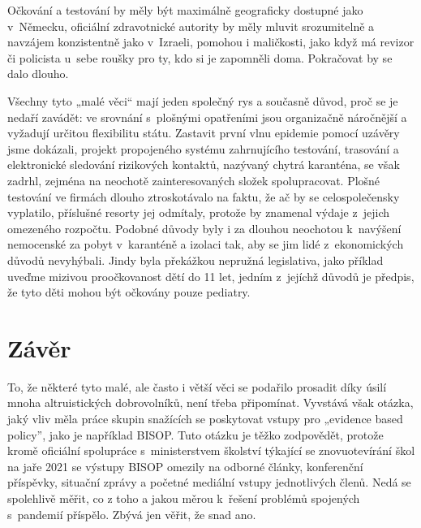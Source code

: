 Očkování a testování by měly být maximálně geograficky dostupné jako v~Ně\-mec\-ku, oficiální zdravotnické autority by měly mluvit srozumitelně a navzájem konzistentně jako v~Izraeli, pomohou i maličkosti, jako když má revizor či policista u~sebe roušky pro ty, kdo si je zapomněli doma. Pokračovat by se dalo dlouho.

Všechny tyto „malé věci“ mají jeden společný rys a současně důvod, proč se je nedaří zavádět: ve srovnání s~plošnými opatřeními jsou organizačně náročnější a vyžadují určitou flexibilitu státu. Zastavit první vlnu epidemie pomocí uzávěry jsme dokázali, projekt propojeného systému zahrnujícího testování, trasování a elektronické sledování rizikových kontaktů, nazývaný chytrá karanténa, se však zadrhl, zejména na neochotě zainteresovaných složek spolupracovat. Plošné testování ve firmách dlouho ztroskotávalo na faktu, že ač by se celospolečensky vyplatilo, příslušné resorty jej odmítaly, protože by znamenal výdaje z~jejich omezeného roz\-poč\-tu. Podobné důvody byly i za dlouhou neochotou k~navýšení nemocenské za pobyt v~karanténě a izolaci tak, aby se jim lidé z~ekonomických důvodů nevyhýbali. Jindy byla překážkou nepružná legislativa, jako příklad uveďme mizivou proočkovanost dětí do 11 let, jedním z~jejíchž důvodů je předpis, že tyto děti mohou být očkovány pouze pediatry. 

\section*{Závěr}

To, že některé tyto malé, ale často i větší věci se podařilo prosadit díky úsilí mnoha altruistických dobrovolníků, není třeba připomínat. Vyvstává však otázka, jaký vliv měla  práce skupin snažících se poskytovat vstupy pro „evidence based policy”, jako je například BISOP.  Tuto otázku je těžko zodpovědět, protože kromě oficiální spolupráce s~ministerstvem školství týkající se znovuotevírání škol na jaře 2021 se výstupy BISOP omezily na odborné články, konferenční příspěvky, situační zprávy a početné mediální vstupy jednotlivých členů. Nedá se spolehlivě měřit, co z toho a jakou měrou k~řešení problémů spojených s~pandemií příspělo. Zbývá jen věřit, že snad ano.


